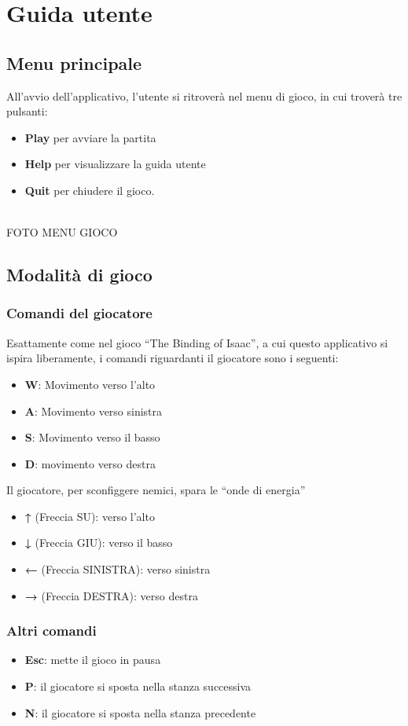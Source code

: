 \documentclass[a4paper,12pt]{report}
\begin{document}
\appendix
\chapter{Guida utente}

\section*{Menu principale}
All'avvio dell'applicativo, l'utente si ritroverà nel menu di gioco, in cui troverà tre pulsanti:
\begin{itemize}
    \item \textbf{Play} per avviare la partita
    \item \textbf{Help} per visualizzare la guida utente 
    \item \textbf{Quit} per chiudere il gioco.
\end{itemize}
\\{FOTO MENU GIOCO}

\section*{Modalità di gioco}
\subsection*{Comandi del giocatore}
Esattamente come nel gioco ``The Binding of Isaac'', a cui questo applicativo si ispira liberamente, i comandi riguardanti il giocatore sono i seguenti:
\begin{itemize}
    \item \textbf{W}: Movimento verso l'alto
    \item \textbf{A}: Movimento verso sinistra
    \item \textbf{S}: Movimento verso il basso
    \item \textbf{D}: movimento verso destra
\end{itemize}
Il giocatore, per sconfiggere nemici, spara le ``onde di energia''
\begin{itemize}
    \item \textbf{↑} (Freccia SU): verso l'alto
    \item \textbf{↓} (Freccia GIU): verso il basso
    \item \textbf{←} (Freccia SINISTRA): verso sinistra
    \item \textbf{→} (Freccia DESTRA): verso destra
\end{itemize}

\subsection*{Altri comandi}
\begin{itemize}
    \item \textbf{Esc}: mette il gioco in pausa
    \item \textbf{P}: il giocatore si sposta nella stanza successiva
    \item \textbf{N}: il giocatore si sposta nella stanza precedente
\end{itemize}
\end{document}
